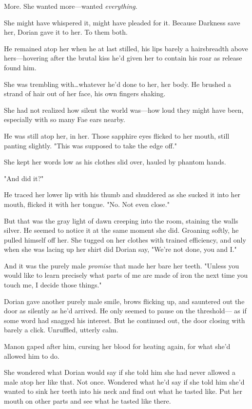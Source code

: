 More.
She wanted more---wanted \emph{everything}.

She might have whispered it, might have pleaded for it.
Because Darkness save her, Dorian gave it to her.
To them both.

He remained atop her when he at last stilled, his lips barely a hairsbreadth above hers---hovering after the brutal kiss he'd given her to contain his roar as release found him.

She was trembling with\ldots whatever he'd done to her, her body.
He brushed a strand of hair out of her face, his own fingers shaking.

She had not realized how silent the world was---how loud they might have been, especially with so many Fae ears nearby.

He was still atop her, in her.
Those sapphire eyes flicked to her mouth, still panting slightly.
"This was supposed to take the edge off."

She kept her words low as his clothes slid over, hauled by phantom hands.

"And did it?"

He traced her lower lip with his thumb and shuddered as she sucked it into her mouth, flicked it with her tongue.
"No.
Not even close."

But that was the gray light of dawn creeping into the room, staining the walls silver.
He seemed to notice it at the same moment she did.
Groaning softly, he pulled himself off her.
She tugged on her clothes with trained efficiency, and only when she was lacing up her shirt did Dorian say, "We're not done, you and I."

And it was the purely male \emph{promise} that made her bare her teeth.
"Unless you would like to learn precisely what parts of me are made of iron the next time you touch me, I decide those things."

Dorian gave another purely male smile, brows flicking up, and sauntered out the door as silently as he'd arrived.
He only seemed to pause on the threshold--- as if some word had snagged his interest.
But he continued out, the door closing with barely a click.
Unruffled, utterly calm.

Manon gaped after him, cursing her blood for heating again, for 
what she'd allowed him to do.

She wondered what Dorian would say if she told him she had never allowed a male atop her like that.
Not once.
Wondered what he'd say if she told him she'd wanted to sink her teeth into his neck and find out what he tasted like.
Put her mouth on other parts and see what he tasted like there.

